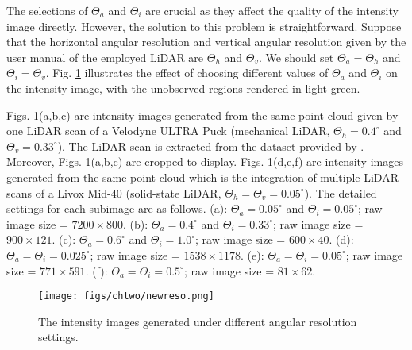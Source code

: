 The selections of $\Theta_{a}$ and $\Theta_{i}$ are crucial as they affect the quality of the intensity image directly. However, the solution to this problem is straightforward. Suppose that the horizontal angular resolution and vertical angular resolution given by the user manual of the employed LiDAR are $\Theta_{h}$ and $\Theta_{v}$. We should set $\Theta_{a}=\Theta_{h}$ and $\Theta_{i}=\Theta_{v}$. Fig. \ref{newreso} illustrates the effect of choosing different values of $\Theta_{a}$ and $\Theta_{i}$ on the intensity image, with the unobserved regions rendered in light green.
\par
Figs. \ref{newreso}(a,b,c) are intensity images generated from the same point cloud given by one LiDAR scan of a Velodyne ULTRA Puck (mechanical LiDAR, $\Theta_{h}=0.4^{\circ}$ and $\Theta_{v}=0.33^{\circ}$). The LiDAR scan is extracted from the dataset provided by \cite{lt}. Moreover, Figs. \ref{newreso}(a,b,c)
are cropped to display.
Figs. \ref{newreso}(d,e,f) are intensity images generated from the same point cloud which is the integration of multiple LiDAR scans of a Livox Mid-40 (solid-state LiDAR, $\Theta_{h}=\Theta_{v}=0.05^{\circ}$). The detailed settings for each subimage are as follows. (a): $\Theta_{a}=0.05^{\circ}$ and $\Theta_{i}=0.05^{\circ}$; raw image size = $7200\times800$. (b): $\Theta_{a}=0.4^{\circ}$ and $\Theta_{i}=0.33^{\circ}$; raw image size = $900\times121$. (c): $\Theta_{a}=0.6^{\circ}$ and $\Theta_{i}=1.0^{\circ}$; raw image size = $600\times40$. (d): $\Theta_{a}=\Theta_{i}=0.025^{\circ}$; raw image size = $1538\times1178$. (e): $\Theta_{a}=\Theta_{i}=0.05^{\circ}$; raw image size = $771\times591$. (f): $\Theta_{a}=\Theta_{i}=0.5^{\circ}$; raw image size = $81\times62$.

\begin{figure}[H] 
	\centering
	\texttt{[image: figs/chtwo/newreso.png]}
 \caption{The intensity images generated under different angular resolution settings.
 }
	\label{newreso}
\end{figure} 

